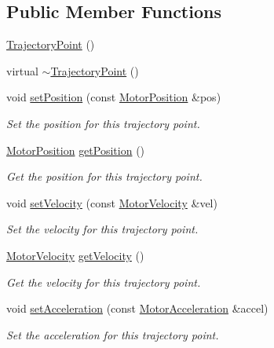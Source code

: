 \subsection*{Public Member Functions}
\begin{DoxyCompactItemize}
\item 
\hyperlink{classTrajectoryPoint_a6880ea8ab699f81587357df0dff311af}{Trajectory\-Point} ()
\item 
virtual \hyperlink{classTrajectoryPoint_ab83a29f27046a0e08c8377bf7b49cf18}{$\sim$\-Trajectory\-Point} ()
\item 
void \hyperlink{classTrajectoryPoint_ae9c5623802ffa61d94a1d401a35c84a5}{set\-Position} (const \hyperlink{classMotorPosition}{Motor\-Position} \&pos)
\begin{DoxyCompactList}\small\item\em Set the position for this trajectory point. \end{DoxyCompactList}\item 
\hyperlink{classMotorPosition}{Motor\-Position} \hyperlink{classTrajectoryPoint_a6958793f5089d26b7dacc81ad5f582c2}{get\-Position} ()
\begin{DoxyCompactList}\small\item\em Get the position for this trajectory point. \end{DoxyCompactList}\item 
void \hyperlink{classTrajectoryPoint_adfe48c8c36f70ce49eb7255422c848c2}{set\-Velocity} (const \hyperlink{classMotorVelocity}{Motor\-Velocity} \&vel)
\begin{DoxyCompactList}\small\item\em Set the velocity for this trajectory point. \end{DoxyCompactList}\item 
\hyperlink{classMotorVelocity}{Motor\-Velocity} \hyperlink{classTrajectoryPoint_af51e54915c13e2e3f8c8370b1e1120c4}{get\-Velocity} ()
\begin{DoxyCompactList}\small\item\em Get the velocity for this trajectory point. \end{DoxyCompactList}\item 
void \hyperlink{classTrajectoryPoint_a27fecd9f51bc986fd19423fd91f34a47}{set\-Acceleration} (const \hyperlink{classMotorAcceleration}{Motor\-Acceleration} \&accel)
\begin{DoxyCompactList}\small\item\em Set the acceleration for this trajectory point. \end{DoxyCompactList}\item 

\end{DoxyCompactItemize}
